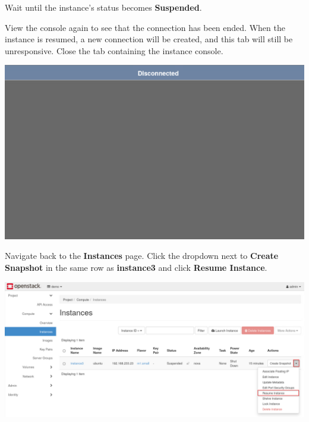 \documentclass[letterpaper, 12pt]{article}
\begin{document}
\begin{enumerate}
    \begin{stopbox}
        Wait until the instance's status becomes \textbf{Suspended}.
    \end{stopbox}

    \begin{labstep}
        View the console again to see that the connection has been ended.
        When the instance is resumed, a new connection will be created, and this tab will still be unresponsive.
        Close the tab containing the instance console.

        \begin{center}
            \includegraphics[width=\linewidth]{images/part3/step14.png}
        \end{center}
    \end{labstep}

    \begin{labstep}
        Navigate back to the \textbf{Instances} page.
        Click the dropdown next to \textbf{Create Snapshot} in the same row as \textbf{instance3} and click \textbf{Resume Instance}.

        \begin{center}
            \includegraphics[width=\linewidth]{images/part3/step15.png}
        \end{center}
    \end{labstep}


\end{enumerate}
\end{document}
